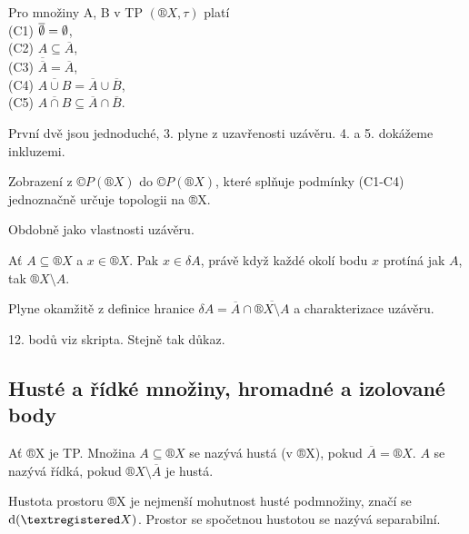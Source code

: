\documentclass[12pt]{article}					%
\begin{document}
        \begin{tvrzeni}
            Pro množiny A, B v TP $(®X, \tau)$ platí\\
            (C1) $\overline{\emptyset} = \emptyset$,\\
            (C2) $A \subseteq \overline{A}$,\\
            (C3) $\overline{\overline{A}} = \overline{A}$,\\
            (C4) $\overline{A \cup B} = \overline{A} \cup \overline{B}$,\\
            (C5) $\overline{A \cap B} \subseteq \overline{A} \cap \overline{B}$.

            \begin{dukazin}
                První dvě jsou jednoduché, 3. plyne z uzavřenosti uzávěru. 4. a 5. dokážeme inkluzemi.
            \end{dukazin}
        \end{tvrzeni}

        \begin{priklad}
            Zobrazení z $©P(®X)$ do $©P(®X)$, které splňuje podmínky (C1-C4) jednoznačně určuje topologii na ®X.
        \end{priklad}

        \begin{tvrzeni}
            Obdobně jako vlastnosti uzávěru.
        \end{tvrzeni}

        \begin{tvrzeni}
            Ať $A \subseteq ®X$ a $x \in ®X$. Pak $x \in \delta A$, právě když každé okolí bodu $x$ protíná jak $A$, tak $®X \setminus A$.
            \begin{dukazin}
                Plyne okamžitě z definice hranice $\delta A = \overline{A} \cap \overline{®X \setminus A}$ a charakterizace uzávěru.
            \end{dukazin}
        \end{tvrzeni}

        \begin{tvrzeni}
            12. bodů viz skripta. Stejně tak důkaz.
        \end{tvrzeni}
    
    \subsection{Husté a řídké množiny, hromadné a izolované body}
        \begin{definice}
            Ať ®X je TP. Množina $A \subseteq ®X$ se nazývá hustá (v ®X), pokud $\overline{A} = ®X$. $A$ se nazývá řídká, pokud $®X \setminus \overline{A}$ je hustá.

            Hustota prostoru ®X je nejmenší mohutnost husté podmnožiny, značí se $\den(®X)$. Prostor se spočetnou hustotou se nazývá separabilní.
        \end{definice}
\end{document}
